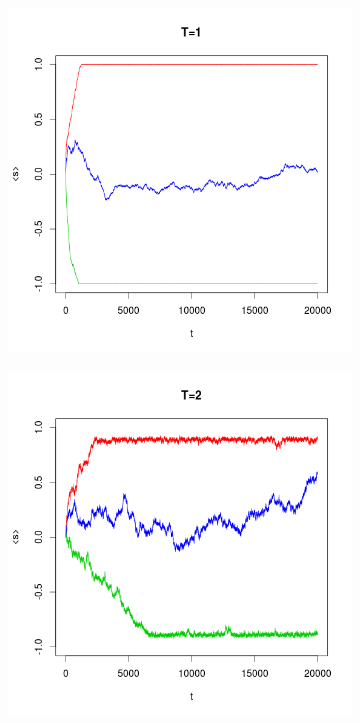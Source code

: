 \documentclass{scrartcl}
\begin{document}
\begin{figure}[ht]
\centering
\begin{subfigure}{.5\textwidth}
  \centering
  \includegraphics[width=1\linewidth]{T1}
\end{subfigure}%
\begin{subfigure}{.5\textwidth}
  \centering
  \includegraphics[width=1\linewidth]{T2}

\end{subfigure}
\end{figure}
\end{document}
